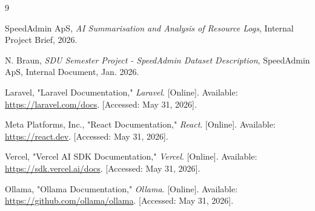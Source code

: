\documentclass[12pt, a4paper]{article}
\begin{document}
\begin{thebibliography}{9}

    SpeedAdmin ApS, \textit{AI Summarisation and Analysis of Resource Logs}, Internal Project Brief, 2026.

    N. Braun, \textit{SDU Semester Project - SpeedAdmin Dataset Description}, SpeedAdmin ApS, Internal Document, Jan. 2026.

    Laravel, "Laravel Documentation," \textit{Laravel}. [Online]. Available: \url{https://laravel.com/docs}. [Accessed: May 31, 2026].

    Meta Platforms, Inc., "React Documentation," \textit{React}. [Online]. Available: \url{https://react.dev}. [Accessed: May 31, 2026].

    Vercel, "Vercel AI SDK Documentation," \textit{Vercel}. [Online]. Available: \url{https://sdk.vercel.ai/docs}. [Accessed: May 31, 2026].

    Ollama, "Ollama Documentation," \textit{Ollama}. [Online]. Available: \url{https://github.com/ollama/ollama}. [Accessed: May 31, 2026].

\end{thebibliography}
\end{document}
